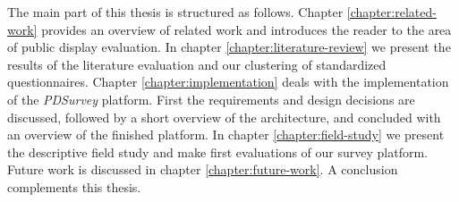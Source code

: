 	The main part of this thesis is structured as follows. Chapter \ref{chapter:related-work} provides an overview of related work and introduces the reader to the area of public display evaluation. In chapter \ref{chapter:literature-review} we present the results of the literature evaluation and our clustering of standardized questionnaires. Chapter \ref{chapter:implementation} deals with the implementation of the \textit{PDSurvey} platform. First the requirements and design decisions are discussed, followed by a short overview of the architecture, and concluded with an overview of the finished platform. In chapter \ref{chapter:field-study} we present the descriptive field study and make first evaluations of our survey platform. Future work is discussed in chapter \ref{chapter:future-work}. A conclusion complements this thesis.












